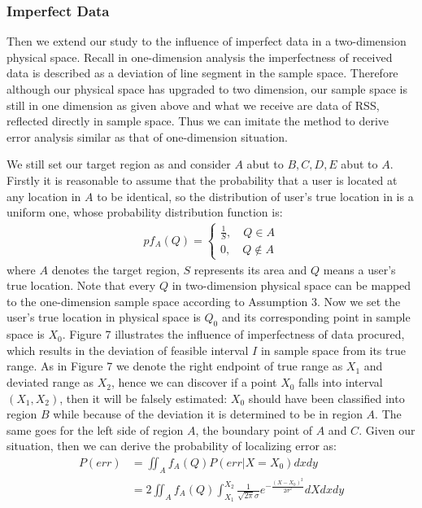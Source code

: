 \documentclass[10pt,conference,compsocconf,letterpaper]{IEEEtran}
\begin{document}
\subsubsection{Imperfect Data}
Then we extend our study to the influence of imperfect data in a two-dimension physical space. Recall in one-dimension analysis the imperfectness of received data is described as a deviation of line segment in the sample space. Therefore although our physical space has upgraded to two dimension, our sample space is still in one dimension as given above and what we receive are data of RSS, reflected directly in sample space. Thus we can imitate the method to derive error analysis similar as that of one-dimension situation.

We still set our target region as  and consider $A$ abut to $B, C, D, E$ abut to $A$. Firstly it is reasonable to assume that the probability that a user is located at any location in $A$ to be identical, so the distribution of user's true location in  is a uniform one, whose probability distribution function is:
\begin{align}
p{f_A}(Q) = \left\{ \begin{array}{l}
\frac{1}{S},\quad Q \in A\\
0,\quad Q \notin A
\end{array} \right.
\end{align}
where $A$ denotes the target region, $S$ represents its area and $Q$ means a user's true location. Note that every $Q$ in two-dimension physical space can be mapped to the one-dimension sample space according to Assumption 3. Now we set the user's true location in physical space is ${Q_0}$ and its corresponding point in sample space is $X_0$. Figure 7 illustrates the influence of imperfectness of data procured, which results in the deviation of feasible interval $I$ in sample space from its true range. As in Figure 7 we denote the right endpoint of true range as $X_1$ and deviated range as $X_2$, hence we can discover if a point $X_0$  falls into interval $(X_1,X_2)$, then it will be falsely estimated: $X_0$ should have been classified into region $B$ while because of the deviation it is determined to be in region $A$. The same goes for the left side of region $A$, the boundary point of $A$ and $C$. Given our situation, then we can derive the probability of localizing error as:
\begin{align}
P(err) &= \iint_A {{f_A}}(Q)P(err|X = {X_0})dxdy\\
&= 2\iint_A {{f_A}}(Q)\int_{{X_1}}^{{X_2}} {\frac{1}{{\sqrt {2\pi } \sigma }}{e^{ - \frac{{{{(X - {X_0})}^2}}}{{2{\sigma ^2}}}}}} dXdxdy
\end{align}
\end{document}
